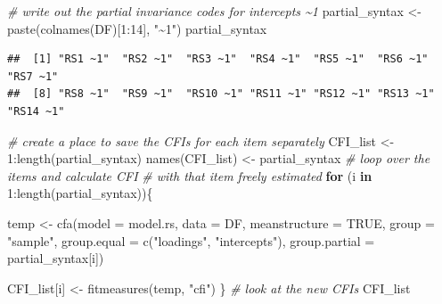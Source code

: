 \documentclass[
  man]{apa7}
\newenvironment{Shaded}{\begin{snugshade}}{\end{snugshade}}
\newcommand{\AttributeTok}[1]{\textcolor[rgb]{0.77,0.63,0.00}{#1}}
\newcommand{\CommentTok}[1]{\textcolor[rgb]{0.56,0.35,0.01}{\textit{#1}}}
\newcommand{\ConstantTok}[1]{\textcolor[rgb]{0.00,0.00,0.00}{#1}}
\newcommand{\ControlFlowTok}[1]{\textcolor[rgb]{0.13,0.29,0.53}{\textbf{#1}}}
\newcommand{\DecValTok}[1]{\textcolor[rgb]{0.00,0.00,0.81}{#1}}
\newcommand{\FunctionTok}[1]{\textcolor[rgb]{0.00,0.00,0.00}{#1}}
\newcommand{\NormalTok}[1]{#1}
\newcommand{\OtherTok}[1]{\textcolor[rgb]{0.56,0.35,0.01}{#1}}
\newcommand{\SpecialCharTok}[1]{\textcolor[rgb]{0.00,0.00,0.00}{#1}}
\newcommand{\StringTok}[1]{\textcolor[rgb]{0.31,0.60,0.02}{#1}}
\begin{document}
\small

\begin{Shaded}
\begin{Highlighting}[]
\CommentTok{\# write out the partial invariance codes for intercepts \textasciitilde{}1}
\NormalTok{partial\_syntax }\OtherTok{\textless{}{-}} \FunctionTok{paste}\NormalTok{(}\FunctionTok{colnames}\NormalTok{(DF)[}\DecValTok{1}\SpecialCharTok{:}\DecValTok{14}\NormalTok{], }\StringTok{"\textasciitilde{}1"}\NormalTok{) }
\NormalTok{partial\_syntax}
\end{Highlighting}
\end{Shaded}

\normalsize

\begin{verbatim}
##  [1] "RS1 ~1"  "RS2 ~1"  "RS3 ~1"  "RS4 ~1"  "RS5 ~1"  "RS6 ~1"  "RS7 ~1" 
##  [8] "RS8 ~1"  "RS9 ~1"  "RS10 ~1" "RS11 ~1" "RS12 ~1" "RS13 ~1" "RS14 ~1"
\end{verbatim}

\small

\begin{Shaded}
\begin{Highlighting}[]
\CommentTok{\# create a place to save the CFIs for each item separately}
\NormalTok{CFI\_list  }\OtherTok{\textless{}{-}} \DecValTok{1}\SpecialCharTok{:}\FunctionTok{length}\NormalTok{(partial\_syntax)}
\FunctionTok{names}\NormalTok{(CFI\_list) }\OtherTok{\textless{}{-}}\NormalTok{ partial\_syntax}
\CommentTok{\# loop over the items and calculate CFI }
\CommentTok{\# with that item freely estimated}
\ControlFlowTok{for}\NormalTok{ (i }\ControlFlowTok{in} \DecValTok{1}\SpecialCharTok{:}\FunctionTok{length}\NormalTok{(partial\_syntax))\{}
  
\NormalTok{  temp }\OtherTok{\textless{}{-}} \FunctionTok{cfa}\NormalTok{(}\AttributeTok{model =}\NormalTok{ model.rs, }
              \AttributeTok{data =}\NormalTok{ DF,}
              \AttributeTok{meanstructure =} \ConstantTok{TRUE}\NormalTok{,}
              \AttributeTok{group =} \StringTok{"sample"}\NormalTok{,}
              \AttributeTok{group.equal =} \FunctionTok{c}\NormalTok{(}\StringTok{"loadings"}\NormalTok{, }\StringTok{"intercepts"}\NormalTok{),}
              \AttributeTok{group.partial =}\NormalTok{ partial\_syntax[i])}
  
\NormalTok{  CFI\_list[i] }\OtherTok{\textless{}{-}} \FunctionTok{fitmeasures}\NormalTok{(temp, }\StringTok{"cfi"}\NormalTok{)}
\NormalTok{\}}
\CommentTok{\# look at the new CFIs}
\NormalTok{CFI\_list}
\end{Highlighting}
\end{Shaded}
\end{document}
